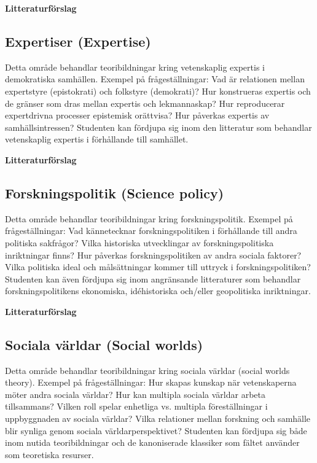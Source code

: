 \documentclass[12pt,a4paper]{article}
\begin{document}
\noindent \textbf{Litteraturförslag}

 \fullcite{}
 
 \fullcite{}
  
 \fullcite{}

\subsection{Expertiser (Expertise)} 
Detta område behandlar teoribildningar kring vetenskaplig expertis i demokratiska samhällen. Exempel på frågeställningar: Vad är relationen mellan expertstyre (epistokrati) och folkstyre (demokrati)? Hur konstrueras expertis och de gränser som dras mellan expertis och lekmannaskap? Hur reproducerar expertdrivna processer epistemisk orättvisa? Hur påverkas expertis av samhällsintressen? Studenten kan fördjupa sig inom den litteratur som behandlar vetenskaplig expertis i förhållande till samhället. 


\noindent \textbf{Litteraturförslag}

 \fullcite{}
 
 \fullcite{}
  
 \fullcite{}

\subsection{Forskningspolitik (Science policy)}
Detta område behandlar teoribildningar kring forskningspolitik. Exempel på frågeställningar: Vad kännetecknar forskningspolitiken i förhållande till andra politiska sakfrågor? Vilka historiska utvecklingar av forskningspolitiska inriktningar finns? Hur påverkas forskningspolitiken av andra sociala faktorer? Vilka politiska ideal och målsättningar kommer till uttryck i forskningspolitiken? Studenten kan även fördjupa sig inom angränsande litteraturer som behandlar forskningspolitikens ekonomiska, idéhistoriska och/eller geopolitiska inriktningar.


\noindent \textbf{Litteraturförslag}

 \fullcite{}
 
 \fullcite{}
  
 \fullcite{} 

\subsection{Sociala världar (Social worlds)}
Detta område behandlar teoribildningar kring sociala världar (social worlds theory). Exempel på frågeställningar: Hur skapas kunskap när vetenskaperna möter andra sociala världar? Hur kan multipla sociala världar arbeta tillsammans? Vilken roll spelar enhetliga vs. multipla föreställningar i uppbyggnaden av sociala världar? Vilka relationer mellan forskning och samhälle blir synliga genom sociala världarperspektivet? Studenten kan fördjupa sig både inom nutida teoribildningar och de kanoniserade klassiker som fältet använder som teoretiska resurser. 
\end{document}
